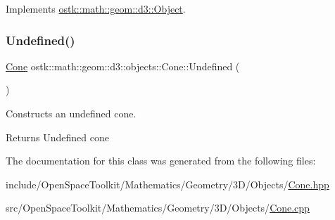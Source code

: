 Implements \hyperlink{classostk_1_1math_1_1geom_1_1d3_1_1_object_ab2a2a782503b97d1cecabdfedc636fce}{ostk\+::math\+::geom\+::d3\+::\+Object}.

\mbox{\label{classostk_1_1math_1_1geom_1_1d3_1_1objects_1_1_cone_a06438bb2e619615fcbbce8097186edbe}} 
\subsubsection{\texorpdfstring{Undefined()}{Undefined()}}
{\footnotesize\ttfamily \hyperlink{classostk_1_1math_1_1geom_1_1d3_1_1objects_1_1_cone}{Cone} ostk\+::math\+::geom\+::d3\+::objects\+::\+Cone\+::\+Undefined (\begin{DoxyParamCaption}{ }\end{DoxyParamCaption})\hspace{0.3cm}{\ttfamily [static]}}



Constructs an undefined cone. 

\begin{DoxyReturn}{Returns}
Undefined cone 
\end{DoxyReturn}


The documentation for this class was generated from the following files\+:\begin{DoxyCompactItemize}
\item 
include/\+Open\+Space\+Toolkit/\+Mathematics/\+Geometry/3\+D/\+Objects/\hyperlink{_cone_8hpp}{Cone.\+hpp}\item 
src/\+Open\+Space\+Toolkit/\+Mathematics/\+Geometry/3\+D/\+Objects/\hyperlink{_cone_8cpp}{Cone.\+cpp}\end{DoxyCompactItemize}
